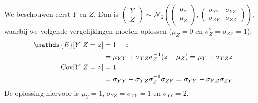 \documentclass[a4paper,dutch,11pt,]{scrartcl}
\begin{document}
We beschouwen eerst $Y$ en $Z$. Dan is $\begin{pmatrix} Y \\Z \end{pmatrix} \sim \mathcal{N}_2( \begin{pmatrix} \mu_Y \\ \mu_Z \end{pmatrix}, 
\begin{pmatrix}
\sigma_{YY} & \sigma_{YZ} \\
\sigma_{ZY} & \sigma_{ZZ} 
\end{pmatrix})$,
waarbij we volgende vergelijkingen moeten oplossen ($\mu_Z = 0$ en $\sigma_{Z}^2 = \sigma_{ZZ} = 1$):
\begin{align*}
 \mathds{E}[{Y|Z=z}] &= 1+z \\      &= \mu_{YY} + \sigma_{YZ} \sigma_{Z}^{-1} (z-\mu_Z) = \mu_Y + \sigma_{YZ} z    \\
 \textnormal{Cov}[{Y|Z=z}] &= 1 \\ &= \sigma_{YY} - \sigma_{YZ}\sigma_{Z}^{-1}\sigma_{ZY} = \sigma_{YY} - \sigma_{YZ}\sigma_{ZY}  
\end{align*}
De oplossing hiervoor is $\mu_Y = 1$, $\sigma_{YZ} = \sigma_{ZY} = 1$ en $\sigma_{YY} = 2$.
\end{document}
